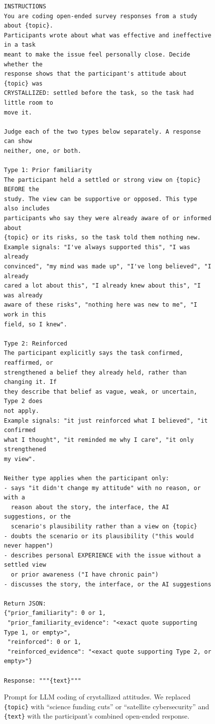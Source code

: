 \documentclass[11pt]{article}
\begin{document}
\begin{figure}[H]
{\footnotesize
\begin{verbatim}
INSTRUCTIONS
You are coding open-ended survey responses from a study about {topic}.
Participants wrote about what was effective and ineffective in a task
meant to make the issue feel personally close. Decide whether the
response shows that the participant's attitude about {topic} was
CRYSTALLIZED: settled before the task, so the task had little room to
move it.

Judge each of the two types below separately. A response can show
neither, one, or both.

Type 1: Prior familiarity
The participant held a settled or strong view on {topic} BEFORE the
study. The view can be supportive or opposed. This type also includes
participants who say they were already aware of or informed about
{topic} or its risks, so the task told them nothing new.
Example signals: "I've always supported this", "I was already
convinced", "my mind was made up", "I've long believed", "I already
cared a lot about this", "I already knew about this", "I was already
aware of these risks", "nothing here was new to me", "I work in this
field, so I knew".

Type 2: Reinforced
The participant explicitly says the task confirmed, reaffirmed, or
strengthened a belief they already held, rather than changing it. If
they describe that belief as vague, weak, or uncertain, Type 2 does
not apply.
Example signals: "it just reinforced what I believed", "it confirmed
what I thought", "it reminded me why I care", "it only strengthened
my view".

Neither type applies when the participant only:
- says "it didn't change my attitude" with no reason, or with a
  reason about the story, the interface, the AI suggestions, or the
  scenario's plausibility rather than a view on {topic}
- doubts the scenario or its plausibility ("this would never happen")
- describes personal EXPERIENCE with the issue without a settled view
  or prior awareness ("I have chronic pain")
- discusses the story, the interface, or the AI suggestions

Return JSON:
{"prior_familiarity": 0 or 1,
 "prior_familiarity_evidence": "<exact quote supporting Type 1, or empty>",
 "reinforced": 0 or 1,
 "reinforced_evidence": "<exact quote supporting Type 2, or empty>"}

Response: """{text}"""
\end{verbatim}
}
\caption{Prompt for LLM coding of crystallized attitudes. We replaced \texttt{\{topic\}} with ``science funding cuts'' or ``satellite cybersecurity'' and \texttt{\{text\}} with the participant's combined open-ended response.}
\label{fig:crystallization-prompt}
\end{figure}
\end{document}
